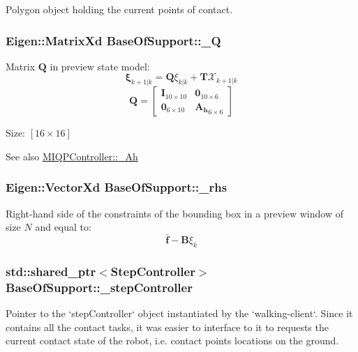 \-Polygon object holding the current points of contact. \hypertarget{classBaseOfSupport_a22efc7f81862ffd1268b862ddb9d59ff}{
\subsubsection[{\-\_\-\-Q}]{\setlength{\rightskip}{0pt plus 5cm}\-Eigen\-::\-Matrix\-Xd {\bf \-Base\-Of\-Support\-::\-\_\-\-Q}}}\label{classBaseOfSupport_a22efc7f81862ffd1268b862ddb9d59ff}
\-Matrix $\mathbf{Q}$ in preview state model\-: \[ \mathbf{\xi}_{k+1|k} = \mathbf{Q} \xi_{k|k} + \mathbf{T}\mathcal{X}_{k+1|k} \] \[ \mathbf{Q} = \left[\begin{array}{cc} \mathbf{I}_{10\times10} & \mathbf{0}_{10\times6}\\ \mathbf{0}_{6\times10} & \mathbf{A_h}_{6\times6} \end{array}\right] \]

\-Size\-: $[16\times16]$

\begin{DoxySeeAlso}{\-See also}
\hyperlink{classMIQPController_a388ed1c232c212e171276993b5cb3fec}{\-M\-I\-Q\-P\-Controller\-::\-\_\-\-Ah} 
\end{DoxySeeAlso}
\hypertarget{classBaseOfSupport_a274325bb39f10aac06153b82a2541c3b}{
\subsubsection[{\-\_\-rhs}]{\setlength{\rightskip}{0pt plus 5cm}\-Eigen\-::\-Vector\-Xd {\bf \-Base\-Of\-Support\-::\-\_\-rhs}}}\label{classBaseOfSupport_a274325bb39f10aac06153b82a2541c3b}
\-Right-\/hand side of the constraints of the bounding box in a preview window of size $N$ and equal to\-: \[ \bar{\mathbf{f}} - \mathbf{B}\xi_k \] \hypertarget{classBaseOfSupport_a023d28c6900f0e97d9de42ca2c5d94a5}{
\subsubsection[{\-\_\-step\-Controller}]{\setlength{\rightskip}{0pt plus 5cm}std\-::shared\-\_\-ptr$<${\bf \-Step\-Controller}$>$ {\bf \-Base\-Of\-Support\-::\-\_\-step\-Controller}}}\label{classBaseOfSupport_a023d28c6900f0e97d9de42ca2c5d94a5}
\-Pointer to the `step\-Controller` object instantiated by the `walking-\/client`. \-Since it contains all the contact tasks, it was easier to interface to it to requests the current contact state of the robot, i.\-e. contact points locations on the ground.

